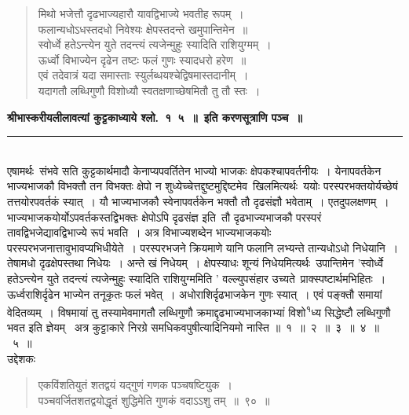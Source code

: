 \documentclass[11pt, openany]{book}
\begin{document}
\newpage
\thispagestyle{fancy}
\fancyhf{}

\begin{quote}
{\qt 
मिथो भजेत्तौ दृढभाज्यहारौ यावद्विभाज्ये भवतीह रूपम्~।\\
फलान्यधोऽधस्तदधो निवेश्यः क्षेपस्तदन्ते खमुपान्तिमेन~॥\\
स्वोर्ध्वे हतेऽन्त्येन युते तदन्त्यं त्यजेन्मुहुः स्यादिति राशियुग्मम्~।\\
ऊर्ध्वो विभाज्येन दृढेन तष्टः फलं गुणः स्यादधरो हरेण~॥\\
एवं तदेवात्रं यदा समास्ताः स्युर्लब्धयश्चेद्विषमास्तदानीम्~।\\
यदागतौ लब्धिगुणौ विशोध्यौ स्वतक्षणाच्छेषमितौ तु तौ स्तः~।}\\
\end{quote}
\centering
\textbf{श्रीभास्करीयलीलावत्यां कुट्टकाध्याये श्लो.~१\textendash\ ५~॥~इति करणसूत्राणि पञ्च~॥\\}

\rule{0.2\linewidth}{1.0pt}\\

\vspace{1cm}
\justifying
\indent
एषामर्थः\textendash\ संभवे सति कुट्टकार्थमादौ केनाप्यपवर्तितेन भाज्यो भाजकः क्षेपकश्चापवर्तनीयः~। येनापवर्तकेन भाज्यभाजकौ विभक्तौ तन विभक्तः क्षेपो न शुध्येच्चेत्तद्दुष्टमुद्दिष्टमेव\textendash\ खिलमित्यर्थः\textendash\ ययोः परस्परभक्तयोर्यच्छेषं तत्तयोरपवर्तकं स्यात्~। यौ भाज्यभाजकौ स्वेनापवर्तकेन भक्तौ तौ दृढसंज्ञौ भवेताम्~। एतदुपलक्षणम्~। भाज्यभाजकयोर्योऽपवर्तकस्तद्विभक्तः क्षेपोऽपि दृढसंज्ञ इति\textendash\ तौ दृढभाज्यभाजकौ परस्परं तावद्विभजेद्यावद्विभाज्ये रूपं भवति~। अत्र विभाज्यशब्देन भाज्यभाजकयोः परस्परभजनात्तावुभावप्यभिधीयेते~। परस्परभजने क्रियमाणे यानि फलानि लभ्यन्ते तान्यधोऽधो निधेयानि~। तेषामधो दृढक्षेपस्तथा निधेयः~। अन्ते खं निधेयम्~। क्षेपस्याधः शून्यं निधेयमित्यर्थः\textendash\ उपान्तिमेन 'स्वोर्ध्वे हतेऽन्त्येन युते तदन्त्यं त्यजेन्मुहुः स्यादिति राशियुग्ममिति ' वल्ल्युपसंहार उच्यते\textendash\ प्राक्स्पष्टार्थमभिहितः~। ऊर्ध्वराशिर्दृढेन भाज्येन तनूकृतः फलं भवेत्~। अधोराशिर्दृढभाजकेन गुणः स्यात्~। एवं पङ्क्तौ समायां वेदितव्यम्~। विषमायां तु तस्यामेवमागतौ लब्धिगुणौ क्रमाद्दृढभाज्यभाजकाभ्यां विशो\textsuperscript{१}ध्य सिद्धेष्टौ लब्धिगुणौ भवत इति ज्ञेयम् \textendash\ अत्र कुट्टाकारे निरग्रे समधिकवपुषीत्यादिनियमो नास्ति ॥~१~॥~२~॥~३~॥~४~॥~५~॥\\
उद्देशकः\textendash
\begin{quote}
{\ku एकविंशतियुतं शतद्वयं यद्गुणं गणक पञ्चषष्टियुक~।\\
पञ्चवर्जितशतद्वयोद्धृतं शुद्धिमेति गुणकं वदाऽऽशु तम्~॥~९०~॥}
\end{quote}
\end{document}

